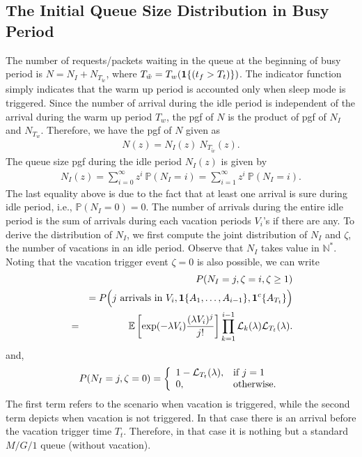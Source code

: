 \documentclass[journal]{IEEEtran}
\newcommand {\bear} {\begin{eqnarray}}
\newcommand {\eear} {\end{eqnarray}}
\newcommand {\bears} {\begin{eqnarray*}}
\newcommand {\eears} {\end{eqnarray*}}
\def \E{{\mathbb E}}
\def \P{{\mathbb P}}
\def\N{{\mathbb N}}
\def\bone{{\mathrm 1\!\!I}}
\def\bone{{\textbf 1}}
\begin{document}
\subsection{The Initial Queue Size Distribution in Busy Period}
The number of requests/packets waiting in the queue at the beginning of busy period is $N=N_I+N_{T_{\tilde{w}}}$, where $T_{\tilde{w}}=T_{w}(\bone\{(t_f>T_t)\})$. The indicator function simply indicates that the warm up period is accounted only when sleep mode is triggered. Since the number of arrival during the idle period is independent of the arrival during the warm up period $T_w$,
the pgf of $N$ is the product of pgf of $N_I$ and $N_{T_w}$. Therefore, we have the pgf of $N$  given as 
\bear N(z)=N_I(z)~N_{T_{\tilde{w}}}(z). \eear
The queue size pgf during the idle period $N_I(z)$ is given by
\bear \label{e:ZI_z} N_I(z)=\sum_{i=0}^\infty
z^i~\P(N_I=i)=\sum_{i=1}^\infty z^i~\P(N_I=i).
\eear
The last equality above is due to the fact that at least one arrival is sure during idle period, i.e., $\P(N_I=0)=0$. The number of arrivals during the entire idle period is the sum of arrivals during each vacation periods $V_i$'s if there are any. To derive the distribution of $N_I$, we first compute the joint distribution of $N_I$ and $\zeta$, the number of vacations in an idle period. Observe that $N_I$ takes value in $\N^*$. Noting that the vacation trigger event $\zeta=0$ is also possible, we can write 
\bears
&&P(N_I=j,\zeta=i,\zeta \geq 1)
\\&&=P\Big(j \textrm{ arrivals in }V_i,\bone\{A_1,\ldots,A_{i-1}\}, \bone^c\{A_{T_t} \} \Big)\\
&=&\E\left[\exp(-\lambda V_i)\frac{(\lambda V_i)^j}{j!}\right]\prod_{k=1}^{i-1} {\cal L}_k(\lambda){\cal L}_{T_t}(\lambda).
\eears
and, 
\bears
{P(N_I=j,\zeta = 0)}
= \left\{
\begin{array}{ll}
1-{\cal L}_{T_t}(\lambda), & \hbox{if } j = 1 \\
0, & \mbox{otherwise.}
\end{array}
\right.
\eears
The first term refers to the scenario when vacation is triggered, while the second term depicts when vacation is not triggered. In that case there is an arrival before the vacation trigger time $T_t$.
Therefore, in that case it is nothing but a standard $M/G/1$ queue (without vacation).
\end{document}
